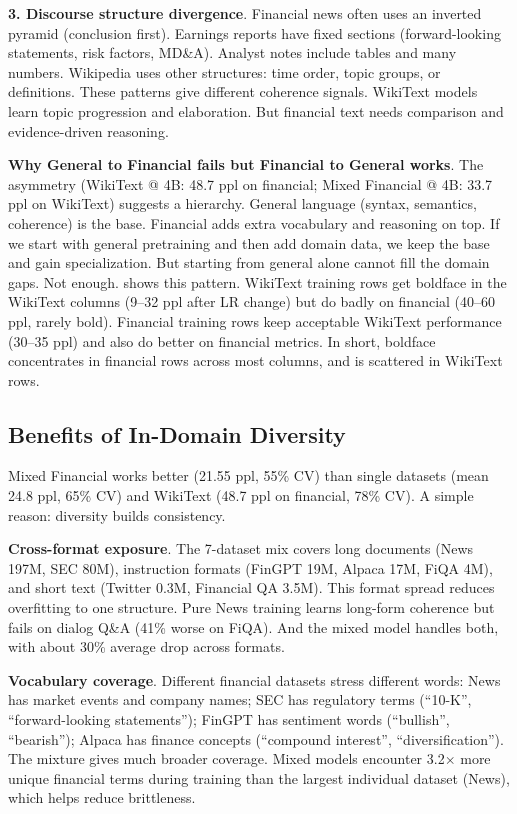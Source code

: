 \textbf{3. Discourse structure divergence}. Financial news often uses an inverted pyramid (conclusion first). Earnings reports have fixed sections (forward-looking statements, risk factors, MD\&A). Analyst notes include tables and many numbers. Wikipedia uses other structures: time order, topic groups, or definitions. These patterns give different coherence signals. WikiText models learn topic progression and elaboration. But financial text needs comparison and evidence-driven reasoning.

\textbf{Why General to Financial fails but Financial to General works}. The asymmetry (WikiText @ 4B: 48.7 ppl on financial; Mixed Financial @ 4B: 33.7 ppl on WikiText) suggests a hierarchy. General language (syntax, semantics, coherence) is the base. Financial adds extra vocabulary and reasoning on top. If we start with general pretraining and then add domain data, we keep the base and gain specialization. But starting from general alone cannot fill the domain gaps. Not enough.  shows this pattern. WikiText training rows get boldface in the WikiText columns (9--32 ppl after LR change) but do badly on financial (40--60 ppl, rarely bold). Financial training rows keep acceptable WikiText performance (30--35 ppl) and also do better on financial metrics. In short, boldface concentrates in financial rows across most columns, and is scattered in WikiText rows.

\subsection{Benefits of In-Domain Diversity}

Mixed Financial works better (21.55 ppl, 55\% CV) than single datasets (mean 24.8 ppl, 65\% CV) and WikiText (48.7 ppl on financial, 78\% CV). A simple reason: diversity builds consistency.

\textbf{Cross-format exposure}. The 7-dataset mix covers long documents (News 197M, SEC 80M), instruction formats (FinGPT 19M, Alpaca 17M, FiQA 4M), and short text (Twitter 0.3M, Financial QA 3.5M). This format spread reduces overfitting to one structure. Pure News training learns long-form coherence but fails on dialog Q\&A (41\% worse on FiQA). And the mixed model handles both, with about 30\% average drop across formats.

\textbf{Vocabulary coverage}. Different financial datasets stress different words: News has market events and company names; SEC has regulatory terms (``10-K'', ``forward-looking statements''); FinGPT has sentiment words (``bullish'', ``bearish''); Alpaca has finance concepts (``compound interest'', ``diversification''). The mixture gives much broader coverage. Mixed models encounter 3.2$\times$ more unique financial terms during training than the largest individual dataset (News), which helps reduce brittleness.

